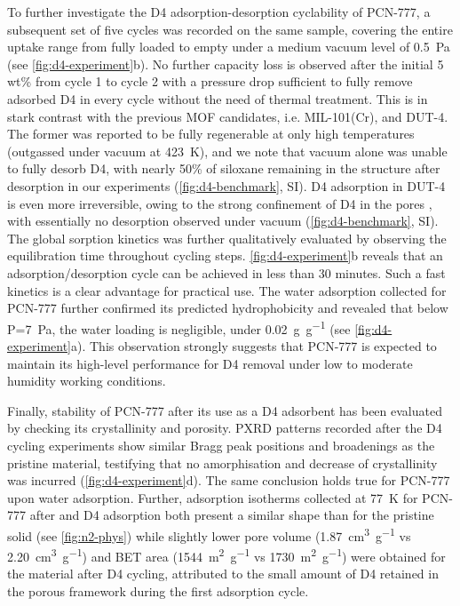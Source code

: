 To further investigate the D4 adsorption-desorption cyclability of PCN-777, a
subsequent set of five cycles was recorded on the same sample, covering the
entire uptake range from fully loaded to empty under a medium vacuum level of
\SI{0.5}{\pascal} (see \cref{fig:d4-experiment}b). No further capacity loss is
observed after the initial 5 wt\% from cycle 1 to cycle 2 with a pressure drop
sufficient to fully remove adsorbed D4 in every cycle without the need of
thermal treatment. This is in stark contrast with the previous MOF candidates,
i.e. MIL-101(Cr), and DUT-4. The former was reported
\citep{gargiuloChromiumbasedMIL101Metal2019} to be fully regenerable at only
high temperatures (outgassed under vacuum at \SI{423}{\kelvin}), and we note
that vacuum alone was unable to fully desorb D4, with nearly 50\% of siloxane
remaining in the structure after desorption in our experiments
(\cref{fig:d4-benchmark}, SI). D4 adsorption in DUT-4 is even more irreversible,
owing to the strong confinement of D4 in the pores
\citep{mito-okaSiloxaneD4Capture2013}, with essentially no desorption observed
under vacuum (\cref{fig:d4-benchmark}, SI). The global sorption kinetics was
further qualitatively evaluated by observing the equilibration time throughout
cycling steps. \cref{fig:d4-experiment}b reveals that an adsorption/desorption
cycle can be achieved in less than 30 minutes. Such a fast kinetics is a clear
advantage for practical use. The water adsorption collected for PCN-777 further
confirmed its predicted hydrophobicity and revealed that below
P=\SI{7}{\pascal}, the water loading is negligible, under
\SI{0.02}{\gram\per\gram} (see \cref{fig:d4-experiment}a). This observation
strongly suggests that PCN-777 is expected to maintain its high-level
performance for D4 removal under low to moderate humidity working conditions.

Finally, stability of PCN-777 after its use as a D4 adsorbent has been evaluated
by checking its crystallinity and porosity. PXRD patterns recorded after the D4
cycling experiments show similar Bragg peak positions and broadenings as the
pristine material, testifying that no amorphisation and decrease of
crystallinity was incurred (\cref{fig:d4-experiment}d). The same conclusion
holds true for PCN-777 upon water adsorption. Further,  adsorption
isotherms collected at \SI{77}{\kelvin} for PCN-777 after  and D4
adsorption both present a similar shape than for the pristine solid (see
\cref{fig:n2-phys}) while slightly lower pore volume
(\SI{1.87}{\centi\metre\cubed\per\gram} vs
\SI{2.20}{\centi\metre\cubed\per\gram}) and BET area
(\SI{1544}{\metre\squared\per\gram} vs \SI{1730}{\metre\squared\per\gram}) were
obtained for the material after D4 cycling, attributed to the small amount of D4
retained in the porous framework during the first adsorption cycle.

